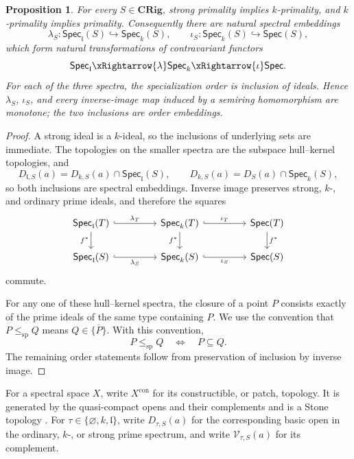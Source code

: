 \documentclass[12pt,leqno]{amsart}
\newcommand{\CRig}{\mathbf{CRig}}
\newcommand{\Spec}{\mathsf{Spec}}
\newcommand{\Speck}{\mathsf{Spec}_{k}}
\newcommand{\Specl}{\mathsf{Spec}_{\mathfrak l}}
\newtheorem{proposition}[theorem]{Proposition}
\theoremstyle{definition}
\numberwithin{equation}{section}
\theoremstyle{remark}
\def\leq{\leqslant}
\begin{document}
\begin{proposition}\label{prop:nested-spectra}
For every \(S\in\CRig\), strong primality implies $k$-primality, and $k$-primality implies primality. Consequently there are natural spectral embeddings
\[
\lambda_S\colon\Specl(S)\hookrightarrow\Speck(S),
\qquad
\iota_S\colon\Speck(S)\hookrightarrow\Spec(S),
\]
which form natural transformations of contravariant functors
\[
\Specl\xRightarrow{\lambda}\Speck\xRightarrow{\iota}\Spec.
\]
For each of the three spectra, the specialization order is inclusion of ideals. Hence \(\lambda_S\), \(\iota_S\), and every inverse-image map induced by a semiring homomorphism are monotone; the two inclusions are order embeddings.
\end{proposition}

\begin{proof}
A strong ideal is a $k$-ideal, so the inclusions of underlying sets are immediate. The topologies on the smaller spectra are the subspace hull--kernel topologies, and
\[
D_{\mathfrak l,S}(a)=D_{k,S}(a)\cap\Specl(S),
\qquad
D_{k,S}(a)=D_S(a)\cap\Speck(S),
\]
so both inclusions are spectral embeddings. Inverse image preserves strong, $k$-, and ordinary prime ideals, and therefore the squares
\[
\begin{tikzcd}[column sep=4.5em]
\Specl(T) \arrow[r,hook,"\lambda_T"] \arrow[d,"f^*"']
& \Speck(T) \arrow[r,hook,"\iota_T"] \arrow[d,"f^*"']
& \Spec(T) \arrow[d,"f^*"]\\
\Specl(S) \arrow[r,hook,"\lambda_S"']
& \Speck(S) \arrow[r,hook,"\iota_S"']
& \Spec(S)
\end{tikzcd}
\]
commute.

For any one of these hull--kernel spectra, the closure of a point $P$ consists exactly of the prime ideals of the same type containing $P$. We use the convention that $P\leq_{\mathrm{sp}}Q$ means $Q\in\overline{\{P\}}$. With this convention,
\[
P\leq_{\mathrm{sp}}Q\quad\Longleftrightarrow\quad P\subseteq Q.
\]
The remaining order statements follow from preservation of inclusion by inverse image.
\end{proof}

For a spectral space $X$, write \(X^{\mathrm{con}}\) for its constructible, or patch, topology. It is generated by the quasi-compact opens and their complements and is a Stone topology \cite{Hochster,Johnstone}. For \(\tau\in\{\varnothing,k,\mathfrak l\}\), write \(D_{\tau,S}(a)\) for the corresponding basic open in the ordinary, $k$-, or strong prime spectrum, and write \(\mathcal V_{\tau,S}(a)\) for its complement.
\end{document}
